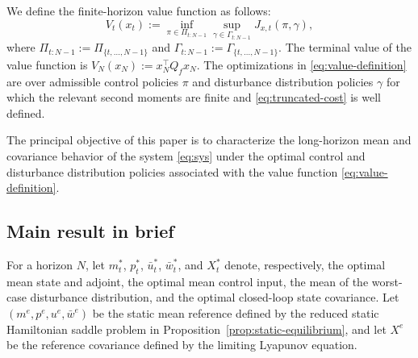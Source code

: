 \documentclass[10pt,journal,twoside]{IEEEtran}
\theoremstyle{definition}
\theoremstyle{remark}
\begin{document}
We define the finite-horizon value function as follows:
\begin{equation}
	V_t(x_t)
	:=
	\inf_{\pi\in\Pi_{t:N-1}}
	\sup_{\gamma\in\Gamma_{t:N-1}}
	J_{x,t}(\pi,\gamma),
	\label{eq:value-definition}
\end{equation}
where
\(\Pi_{t:N-1}:=\Pi_{\{t,\ldots,N-1\}}\) and
\(\Gamma_{t:N-1}:=\Gamma_{\{t,\ldots,N-1\}}\). The terminal value of the value function is
\(
V_N(x_N):=x_N^\top Q_fx_N .
\)
The optimizations in \eqref{eq:value-definition} are over admissible
{control policies $\pi$ and disturbance distribution policies $\gamma$} for which the relevant second moments are finite and
\eqref{eq:truncated-cost} is well defined.










The principal objective of this paper is to characterize the long-horizon mean and covariance behavior of the system \eqref{eq:sys} under the optimal control and disturbance distribution policies associated with the value function \eqref{eq:value-definition}.



\subsection{Main result in brief}



For a horizon \(N\), let \(m_t^*\), \(p_t^*\),
\(\bar{u}_t^*\), \(\bar{w}_t^*\), and \(X_t^*\)
denote, respectively, the optimal mean state and adjoint, the optimal mean
control input, the mean of the worst-case disturbance distribution,
and the optimal closed-loop state covariance. Let \((m^e,p^e,u^e,\bar w^e)\) be the static mean reference defined
by the reduced static Hamiltonian saddle problem in
Proposition~\ref{prop:static-equilibrium}, and let \(X^e\) be the reference covariance defined by
the limiting Lyapunov equation.
\end{document}
